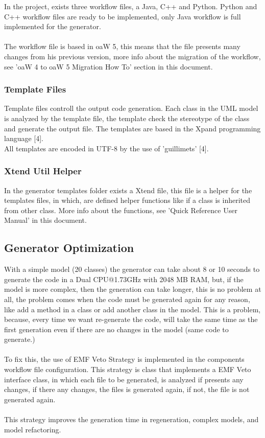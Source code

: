 In the project, exists three workflow files, a Java, C++ and Python. Python
and C++ workflow files are ready to be implemented, only Java workflow is full
implemented for the generator.\\
\\
The workflow file is based in oaW 5, this means that the file presents many
changes from his previous version, more info about the migration of the
workflow, see 'oaW 4 to oaW 5 Migration How To' section in this document. 

\subsubsection{Template Files}
Template files controll the output code generation. Each class in the UML model
is analyzed by the template file, the template check the stereotype of the
class and generate the output file. The templates are based in the Xpand
programming language [4].\\
All templates are encoded in UTF-8 by the use of 'guillimets' [4].

\subsubsection{Xtend Util Helper}
In the generator templates folder exists a Xtend file, this file is a helper
for the templates files, in which, are defined helper functions like if a class
is inherited from other class. More info about the functions, see 'Quick
Reference User Manual' in this document.


\subsection{Generator Optimization}
With a simple model (20 classes) the generator can take about 8 or 10 seconds
to generate the code in a Dual CPU@1.73GHz with 2048 MB RAM, but, if the model
is more complex, then the generation can take longer, this is no problem at
all, the problem comes when the code must be generated again for any
reason, like add a method in a class or add another class in the model. This is
a problem, because, every time we want re-generate the code, will take the same
time as the first generation even if there are no changes in the model (same
code to generate.)\\
\\
To fix this, the use of EMF Veto Strategy is implemented in the components
workflow file configuration. This strategy is class that implements a EMF Veto
interface class, in which each file to be generated, is analyzed if presents any
changes, if there any changes, the files is generated again, if not, the file
is not generated again.\\
\\
This strategy improves the generation time in regeneration, complex models,
and model refactoring.
